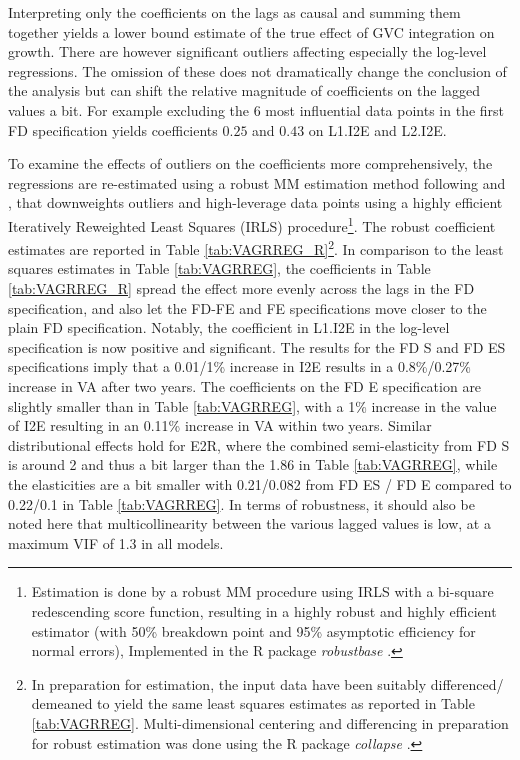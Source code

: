\documentclass[a4paper]{article}
\begin{document}
 Interpreting only the coefficients on the lags as causal and summing them together yields a lower bound estimate of the true effect of GVC integration on growth. There are however significant outliers affecting especially the log-level regressions. The omission of these does not dramatically change the conclusion of the analysis but can shift the relative magnitude of coefficients on the lagged values a bit. For example excluding the 6 most influential data points in the first FD specification yields coefficients $0.25$ and $0.43$ on L1.I2E and L2.I2E. \newline 

To examine the effects of outliers on the coefficients more comprehensively, the regressions are re-estimated using a robust MM estimation method following \citet{yohai1987high} and \citet{koller2011sharpening}, that downweights outliers and high-leverage data points using a highly efficient Iteratively Reweighted Least Squares (IRLS) procedure\footnote{Estimation is done by a robust MM procedure using IRLS with a bi-square redescending score function, resulting in a highly robust and highly efficient estimator (with 50\% breakdown point and 95\% asymptotic efficiency for normal errors), Implemented in the R package \textit{robustbase} \citep{rousseeuw2009robustbase}.}. The robust coefficient estimates are reported in Table \ref{tab:VAGRREG_R}\footnote{In preparation for estimation, the input data have been suitably differenced/ demeaned to yield the same least squares estimates as reported in Table \ref{tab:VAGRREG}. Multi-dimensional centering and differencing in preparation for robust estimation was done using the R package \textit{collapse} \citep{collapse2021}.}. In comparison to the least squares estimates in Table \ref{tab:VAGRREG}, the coefficients in Table \ref{tab:VAGRREG_R} spread the effect more evenly across the lags in the FD specification, and also let the FD-FE and FE specifications move closer to the plain FD specification. Notably, the coefficient in L1.I2E in the log-level specification is now positive and significant. The results for the FD S and FD ES specifications imply that a 0.01/1\% increase in I2E results in a 0.8\%/0.27\% increase in VA after two years. The coefficients on the FD E specification are slightly smaller than in Table  \ref{tab:VAGRREG}, with a 1\% increase in the value of I2E resulting in an 0.11\% increase in VA within two years. Similar distributional effects hold for E2R, where the combined semi-elasticity from FD S is around 2 and thus a bit larger than the 1.86 in Table \ref{tab:VAGRREG}, while the elasticities are a bit smaller with 0.21/0.082 from FD ES / FD E compared to 0.22/0.1 in Table \ref{tab:VAGRREG}. In terms of robustness, it should also be noted here that multicollinearity between the various lagged values is low, at a maximum VIF of 1.3 in all models. 
\end{document}
